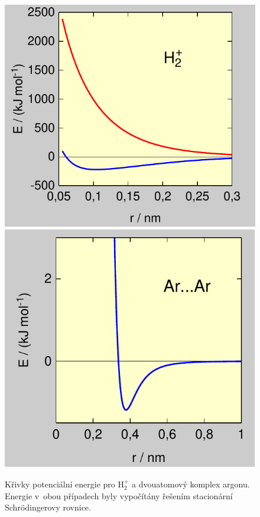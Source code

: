 \begin{figure} [ht]
\centering
\begin{center}\includegraphics[scale=0.8]{obrazky/h2+.pdf}\hspace*{-1pt}\includegraphics[scale=0.8]{obrazky/arar.pdf}\end{center}
\caption[Křivky potenciální energie]{Křivky potenciální energie pro $\mathrm{H}_2^+$ a dvouatomový komplex argonu. Energie v~obou případech byly vypočítány řešením stacionární Schrödingerovy rovnice.}
\label{obr:mol:H2_Ar}
\end{figure}

